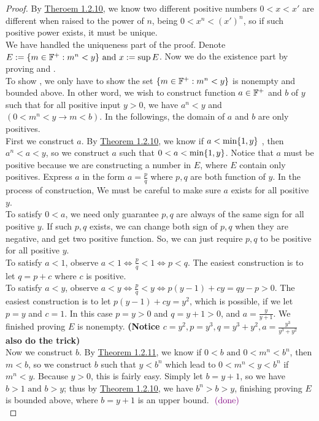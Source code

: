 \documentclass{report}
\begin{document}
\begin{proof}
By \hyperref[1.2.10]{Theroem 1.2.10}, we know two different positive numbers $0<x<x'$ are different when raised to the power of $n$, being $0<x^n<(x')^{n}$, so if such positive power exists, it must be unique.\\

We have handled the uniqueness part of the proof. Denote $E:= \{ m \in\mathbb{F}^+: m^n<y \}\text{ and }x:=\sup E$. Now we do the existence part by proving  and  .\\

To show , we only have to show the set $\{ m \in\mathbb{F}^+: m^n<y \}$ is nonempty and bounded above. In other word, we wish to construct function $a\in\mathbb{F}^+$ and $b$ of $y$ such that for all positive input $y>0$, we have $a^n<y$ and $(0<m^n<y\longrightarrow m<b)$. In the followings, the domain of $a$ and $b$ are only positives.\\

First we construct $a$. By \hyperref[1.2.10]{Theorem 1.2.10}, we know if $a<\min \{ 1,y \}$ , then $a^n<a<y$, so we construct $a$ such that $0<a<\min \{ 1,y \}$. Notice that $a$ must be positive because we are constructing a number in $E$, where $E$ contain only positives. Express $a$ in the form  $a=\frac{p}{q}$ where $p,q$ are both function of $y$. In the process of  construction, We must be careful to make sure $a$ exists for all positive $y$.\\

To satisfy $0<a$, we need only guarantee $p,q$ are always of the same sign for all positive $y$. If such $p,q$ exists, we can change both sign of  $p,q$ when they are negative, and get two positive function. So, we can just require $p,q$ to be positive for all positive $y$.\\      

To satisfy $a<1$, observe $a<1\iff \frac{p}{q}<1\iff p<q$. The easiest construction is to let $q=p+c$ where $c$ is positive.\\

To satisfy $a<y$, observe $a<y\iff \frac{p}{q}<y\iff p(y-1)+cy=qy-p>0$. The easiest construction is to let $p(y-1)+cy=y^2$, which is possible, if we let $p=y$ and $c=1$. In this case $p=y>0$ and $q=y+1>0$, and  $a=\frac{y}{y+1}$. We finished proving $E$ is nonempty. \textbf{(Notice $c=y^2,p=y^3,q=y^3+y^2,a=\frac{y^3}{y^3+y^2}$ also do the trick)}\\

Now we construct $b$. By \hyperref[1.2.11]{Theorem 1.2.11}, we know if $0<b\text{ and }0<m^n<b^n$, then $m<b$, so we construct $b$ such that $y<b^n$ which lead to $0<m^n<y<b^n$ if  $m^n<y$. Because $y>0$, this is fairly easy. Simply let $b=y+1$, so we have $b>1\text{ and }b>y$; thus by \hyperref[1.2.10]{Theorem 1.2.10}, we have $b^n>b>y$, finishing proving $E$ is bounded above, where  $b=y+1$ is an upper bound. $\textcolor{violet}{\text{ (done) }}$ \\


\end{proof}
\end{document}

